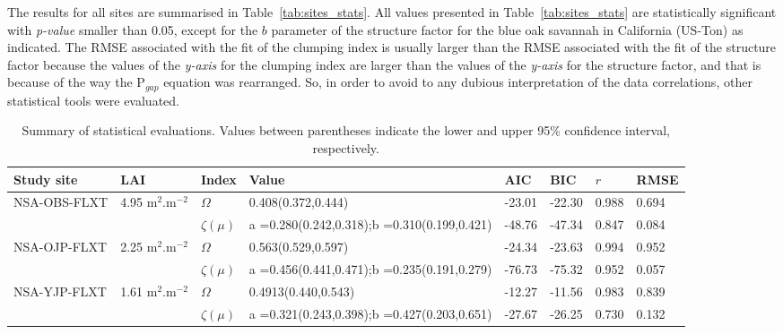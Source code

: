 \documentclass[a4paper,11pt]{report}
\begin{document}
The results for all sites are summarised in Table~\ref{tab:sites_stats}. All values presented in Table~\ref{tab:sites_stats} are statistically significant with \textit{p-value} smaller than 0.05, except for the $b$ parameter of the structure factor for the blue oak savannah in California (US-Ton) as indicated.
The RMSE associated with the fit of the clumping index is usually larger than the RMSE associated with the fit of the structure factor because the values of the \textit{y-axis} for the clumping index are larger than the values of the \textit{y-axis} for the structure factor, and that is because of the way the P$_{gap}$ equation was rearranged. So, in order to avoid to any dubious interpretation of the data correlations, other statistical tools were evaluated.

\begin{sidewaystable}
\caption{Summary of statistical evaluations. Values between parentheses indicate the lower and upper 95\% confidence interval, respectively.}
\begin{tabular}{p{4.0cm} p{2.1cm} p{1.5cm} p{4.1cm} p{2.1cm} p{2.1cm} p{2.1cm} p{2.1cm}}
\hline
\hline   
\bf Study site & \bf LAI &  \bf Index & \bf Value & \bf AIC & \bf BIC & \bf $r$ &  \bf RMSE\\
 \hline
\multirow{2}{*}{NSA-OBS-FLXT} 
     & 4.95 m$^2$.m$^{-2}$ &  \bf $\Omega$         &  0.408(0.372,0.444) & -23.01 &	-22.30	& 0.988 &	0.694\\
     &       &  \bf $\zeta(\mu)$     &  a =0.280(0.242,0.318);\newline b =0.310(0.199,0.421) & -48.76 & -47.34 & 0.847 & 0.084\\
\multirow{2}{*}{NSA-OJP-FLXT} 
     & 2.25 m$^2$.m$^{-2}$ &  \bf $\Omega$     &  0.563(0.529,0.597) & -24.34	& -23.63 & 0.994 & 0.952\\
     &       &  \bf $\zeta(\mu)$ &  a =0.456(0.441,0.471);\newline b =0.235(0.191,0.279) & -76.73 &	-75.32	& 0.952 &	0.057\\
\multirow{2}{*}{NSA-YJP-FLXT} 
     & 1.61 m$^2$.m$^{-2}$ &  \bf $\Omega$         &  0.4913(0.440,0.543) & -12.27 &	-11.56 &	0.983	& 0.839\\
     & &  \bf $\zeta(\mu)$          &  a =0.321(0.243,0.398);\newline b =0.427(0.203,0.651) & -27.67 &	-26.25	& 0.730 &	0.132\\

\end{tabular}
\end{sidewaystable}
\end{document}
